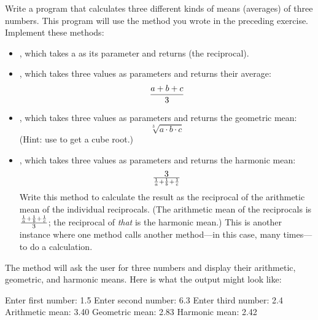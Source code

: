 \begin{exercise}
Write a program that calculates three different kinds of means (averages) of three numbers. This program will use the  method you wrote in the preceding exercise. Implement these methods:

\begin{itemize}
\item {}, which takes a  as its parameter and returns  (the reciprocal).
\item {}, which takes three  values as parameters and returns their average: 
\begin{equation*}
{{a + b + c}\over 3}
\end{equation*}
\item {}, which takes three  values as parameters and returns the geometric mean:
\begin{equation*}
\sqrt[3]{a\cdot b\cdot c}
\end{equation*}
(Hint: use  to get a cube root.)
\item {}, which takes three  values as parameters and returns the harmonic mean:
\begin{equation*}
3\over {{1\over a} + {1\over b} + {1\over c}}
\end{equation*}
Write this method to calculate the result as the reciprocal of the arithmetic mean of the individual reciprocals.  (The arithmetic mean of the reciprocals is ${{1\over a} + {1\over b} + {1\over c}}\over 3$; the reciprocal of {\em that} is the harmonic mean.) This is another instance where one method calls another method---in this case, many times---to do a calculation.
\end{itemize}

The  method will ask the user for three numbers and display their arithmetic, geometric, and harmonic means. Here is what the output might look like:

\begin{stdout}
Enter first number: 1.5
Enter second number: 6.3
Enter third number: 2.4
Arithmetic mean: 3.40
Geometric mean:  2.83
Harmonic mean:   2.42
\end{stdout}

\end{exercise}

